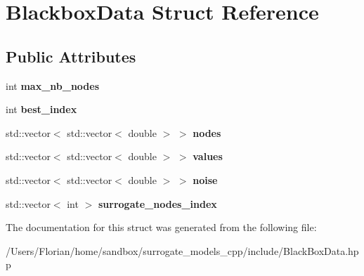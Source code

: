 \hypertarget{struct_blackbox_data}{}\section{Blackbox\+Data Struct Reference}
\label{struct_blackbox_data}
\subsection*{Public Attributes}
\begin{DoxyCompactItemize}
\item 
int {\bfseries max\+\_\+nb\+\_\+nodes}\hypertarget{struct_blackbox_data_a31ea40ae572a4c77a68ff2334193d5b2}{}\label{struct_blackbox_data_a31ea40ae572a4c77a68ff2334193d5b2}

\item 
int {\bfseries best\+\_\+index}\hypertarget{struct_blackbox_data_ae37527ab7b65e032abad66927cda4f6a}{}\label{struct_blackbox_data_ae37527ab7b65e032abad66927cda4f6a}

\item 
std\+::vector$<$ std\+::vector$<$ double $>$ $>$ {\bfseries nodes}\hypertarget{struct_blackbox_data_adc9118d6191244839794efa5fea0e62d}{}\label{struct_blackbox_data_adc9118d6191244839794efa5fea0e62d}

\item 
std\+::vector$<$ std\+::vector$<$ double $>$ $>$ {\bfseries values}\hypertarget{struct_blackbox_data_a57e189af56f019be40597e2f3403c740}{}\label{struct_blackbox_data_a57e189af56f019be40597e2f3403c740}

\item 
std\+::vector$<$ std\+::vector$<$ double $>$ $>$ {\bfseries noise}\hypertarget{struct_blackbox_data_a7ce8dad66db5642faa41bad0c86c71e2}{}\label{struct_blackbox_data_a7ce8dad66db5642faa41bad0c86c71e2}

\item 
std\+::vector$<$ int $>$ {\bfseries surrogate\+\_\+nodes\+\_\+index}\hypertarget{struct_blackbox_data_ac6e17c3f646e1014b08aa6effbd7d75c}{}\label{struct_blackbox_data_ac6e17c3f646e1014b08aa6effbd7d75c}

\end{DoxyCompactItemize}


The documentation for this struct was generated from the following file\+:\begin{DoxyCompactItemize}
\item 
/\+Users/\+Florian/home/sandbox/surrogate\+\_\+models\+\_\+cpp/include/Black\+Box\+Data.\+hpp\end{DoxyCompactItemize}
